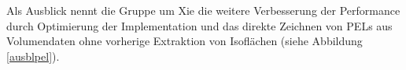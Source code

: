 \documentclass{paperStyle}
\begin{document}
Als Ausblick nennt die Gruppe um Xie die weitere Verbesserung der Performance durch Optimierung der Implementation und das direkte Zeichnen von PELs aus Volumendaten ohne vorherige Extraktion von Isoflächen (siehe Abbildung \ref{ausblpel}). 



\end{document}
